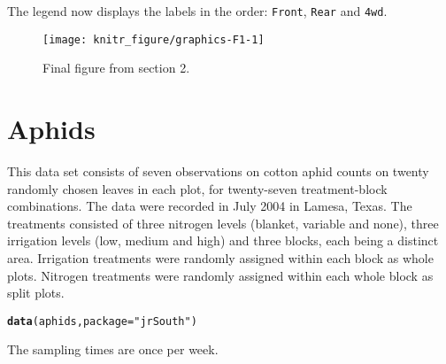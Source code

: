 \documentclass[a4paper,justified,openany]{tufte-handout}\usepackage[]{graphicx}\usepackage[]{color}
\makeatletter
\def\maxwidth{ %
  \ifdim\Gin@nat@width>\linewidth
    \linewidth
  \else
    \Gin@nat@width
  \fi
}
\newcommand{\hlstr}[1]{\textcolor[rgb]{0.2,0.2,0.2}{#1}}%
\newcommand{\hlstd}[1]{\textcolor[rgb]{0.102,0.102,0.102}{#1}}%
\newcommand{\hlkwc}[1]{\textcolor[rgb]{0.2,0.2,0.2}{#1}}%
\newcommand{\hlkwd}[1]{\textcolor[rgb]{0.102,0.102,0.102}{\textbf{#1}}}%
\newenvironment{kframe}{%
 \def\at@end@of@kframe{}%
 \ifinner\ifhmode%
  \def\at@end@of@kframe{\end{minipage}}%
  \begin{minipage}{\columnwidth}%
 \fi\fi%
 \def\FrameCommand##1{\hskip\@totalleftmargin \hskip-\fboxsep
 \colorbox{shadecolor}{##1}\hskip-\fboxsep
     \hskip-\linewidth \hskip-\@totalleftmargin \hskip\columnwidth}%
 \MakeFramed {\advance\hsize-\width
   \@totalleftmargin\z@ \linewidth\hsize
   \@setminipage}}%
 {\par\unskip\endMakeFramed%
 \at@end@of@kframe}
\newenvironment{knitrout}{}{} %
\newcommand{\cc}{\texttt}
\makeatother
\begin{document}
\noindent The legend now displays the labels in the order: \cc{Front}, \cc{Rear} and \cc{4wd}.

\begin{figure}[t]
\centering
\begin{knitrout}
\color{fgcolor}

{\centering \texttt{[image: knitr\_figure/graphics-F1-1]} 

}



\end{knitrout}
\caption{Final figure from section 2.}\label{F1}
\end{figure}

\section{Aphids}

This data set consists of seven observations on cotton aphid counts on twenty
randomly chosen leaves in each plot, for twenty-seven treatment-block
combinations. The data were recorded in July 2004 in Lamesa, Texas. The
treatments consisted of three nitrogen levels (blanket, variable and none),
three irrigation levels (low, medium and high) and three blocks, each being a
distinct area. Irrigation treatments were randomly assigned within each block as
whole plots. Nitrogen treatments were randomly assigned within each whole block
as split plots.

\begin{knitrout}
\color{fgcolor}\begin{kframe}
\begin{alltt}
\hlkwd{data}\hlstd{(aphids,} \hlkwc{package}\hlstd{=}\hlstr{"jrSouth"}\hlstd{)}
\end{alltt}
\end{kframe}
\end{knitrout}

\noindent The sampling times are once per week.
\end{document}
